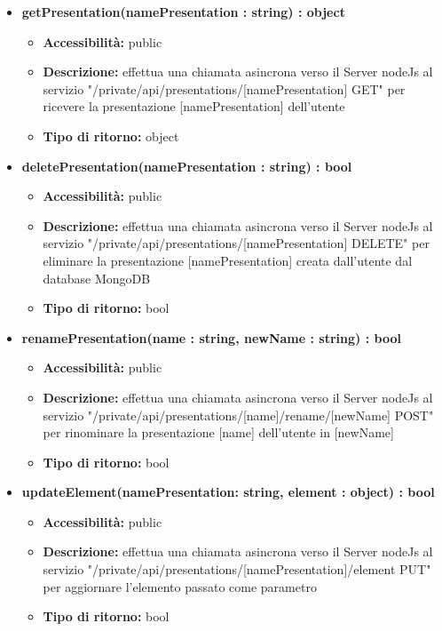 {{\begin{itemize}
		\item \textbf{getPresentation(namePresentation : string) : object}
			\begin{itemize}
			\item \textbf{Accessibilit\`{a}:} public
			\item \textbf{Descrizione:} effettua una chiamata asincrona verso il Server nodeJs al servizio "/private/api/presentations/[namePresentation] GET" per ricevere la presentazione [namePresentation] dell'utente
			\item \textbf{Tipo di ritorno:} object
			\end{itemize}
			
		\item \textbf{deletePresentation(namePresentation : string) : bool}
			\begin{itemize}
			\item \textbf{Accessibilit\`{a}:} public
			\item \textbf{Descrizione:} effettua una chiamata asincrona verso il Server nodeJs al servizio "/private/api/presentations/[namePresentation] DELETE" per eliminare la presentazione [namePresentation] creata dall'utente dal database MongoDB
			\item \textbf{Tipo di ritorno:} bool
			\end{itemize}
			
		\item \textbf{renamePresentation(name : string, newName : string) : bool}
			\begin{itemize}
			\item \textbf{Accessibilit\`{a}:} public
			\item \textbf{Descrizione:} effettua una chiamata asincrona verso il Server nodeJs al servizio "/private/api/presentations/[name]/rename/[newName] POST" per rinominare la presentazione [name] dell'utente in [newName] 
			\item \textbf{Tipo di ritorno:} bool
			\end{itemize}
			
		\item \textbf{updateElement(namePresentation: string, element : object) : bool}
			\begin{itemize}
			\item \textbf{Accessibilit\`{a}:} public
			\item \textbf{Descrizione:} effettua una chiamata asincrona verso il Server nodeJs al servizio "/private/api/presentations/[namePresentation]/element PUT" per aggiornare l'elemento passato come parametro
			\item \textbf{Tipo di ritorno:} bool
			\end{itemize}
			

\end{itemize}}}
